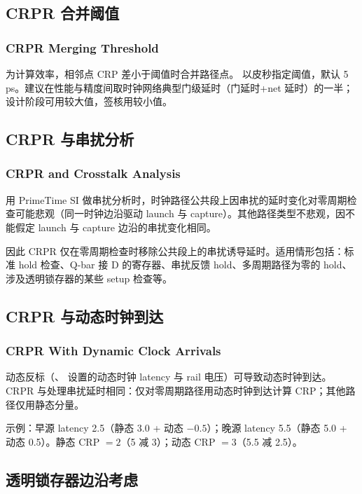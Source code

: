 \subsection{CRPR 合并阈值}
\subsubsection*{CRPR Merging Threshold}

为计算效率，相邻点 CRP 差小于阈值时合并路径点。 以皮秒指定阈值，默认 5 ps。建议在性能与精度间取时钟网络典型门级延时（门延时+net 延时）的一半；设计阶段可用较大值，签核用较小值。

\subsection{CRPR 与串扰分析}
\subsubsection*{CRPR and Crosstalk Analysis}

用 PrimeTime SI 做串扰分析时，时钟路径公共段上因串扰的延时变化对零周期检查可能悲观（同一时钟边沿驱动 launch 与 capture）。其他路径类型不悲观，因不能假定 launch 与 capture 边沿的串扰变化相同。

因此 CRPR 仅在零周期检查时移除公共段上的串扰诱导延时。适用情形包括：标准 hold 检查、Q-bar 接 D 的寄存器、串扰反馈 hold、多周期路径为零的 hold、涉及透明锁存器的某些 setup 检查等。

\subsection{CRPR 与动态时钟到达}
\subsubsection*{CRPR With Dynamic Clock Arrivals}

动态反标（、 设置的动态时钟 latency 与 rail 电压）可导致动态时钟到达。CRPR 与处理串扰延时相同：仅对零周期路径用动态时钟到达计算 CRP；其他路径仅用静态分量。

示例：早源 latency 2.5（静态 3.0 + 动态 $-0.5$）；晚源 latency 5.5（静态 5.0 + 动态 0.5）。静态 CRP $= 2$（5 减 3）；动态 CRP $= 3$（5.5 减 2.5）。

\subsection{透明锁存器边沿考虑}
